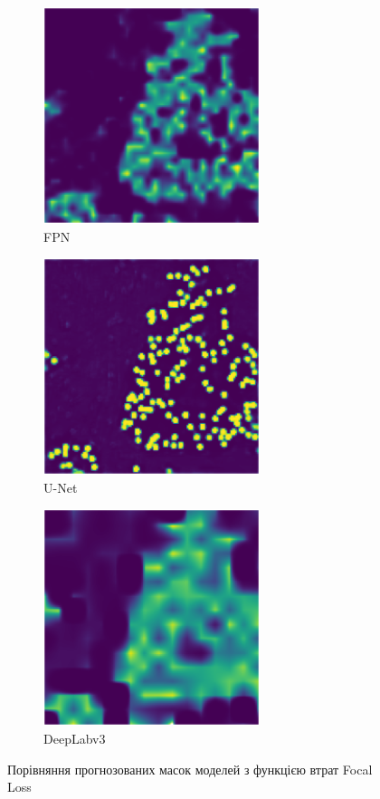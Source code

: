 \begin{figure}[ht]
      \centering
      \begin{subfigure}[b]{0.33\textwidth}
            \includegraphics[scale=0.75]{Images/fpn_focal_pred.png}
            \caption{FPN}
      \end{subfigure}%
      \begin{subfigure}[b]{0.33\textwidth}
            \includegraphics[scale=0.75]{Images/unet_focal_pred.png}
            \caption{U-Net}
      \end{subfigure}
      \begin{subfigure}[b]{0.33\textwidth}
            \includegraphics[scale=0.75]{Images/deeplab_focal_pred.png}
            \caption{DeepLabv3}
      \end{subfigure}

      \caption{Порівняння прогнозованих масок моделей з функцією втрат Focal Loss}
      \label{pred_focal_comp}
\end{figure}

